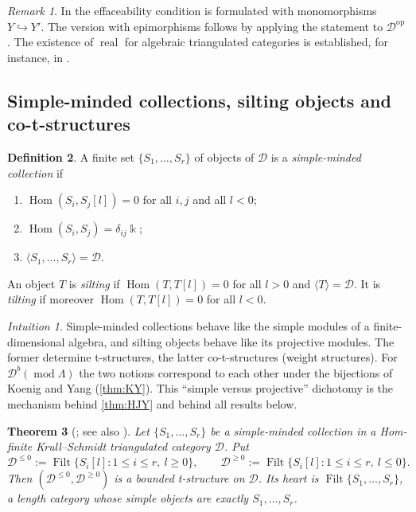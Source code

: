\documentclass[11pt,reqno]{amsart}
\theoremstyle{plain}
\newtheorem{theorem}{Theorem}[section]
\theoremstyle{definition}
\newtheorem{definition}[theorem]{Definition}
\theoremstyle{remark}
\newtheorem{remark}[theorem]{Remark}
\newtheorem*{intuition}{Intuition}
\newcommand{\kk}{\Bbbk}
\DeclareMathOperator{\Hom}{Hom}
\DeclareMathOperator{\Filt}{Filt}
\DeclareMathOperator{\real}{real}
\newcommand{\modd}{\operatorname{mod}}
\newcommand{\Db}{\mathcal{D}^b}
\newcommand{\thick}[1]{\langle #1\rangle}
\newcommand{\cD}{\mathcal{D}}
\begin{document}
\begin{remark}
In \cite[Prop.~3.1.16]{BBD82} the effaceability condition is formulated with monomorphisms $Y\hookrightarrow Y'$. The version with epimorphisms follows by applying the statement to $\cD^{\mathrm{op}}$. The existence of $\real$ for algebraic triangulated categories is established, for instance, in \cite{Let24}.
\end{remark}

\subsection{Simple-minded collections, silting objects and co-t-structures}

\begin{definition}\label{def:smc}
A finite set $\{S_1,\dots,S_r\}$ of objects of $\cD$ is a \emph{simple-minded collection} if
\begin{enumerate}
\item[(SM1)] $\Hom(S_i,S_j[l])=0$ for all $i,j$ and all $l<0$;
\item[(SM2)] $\Hom(S_i,S_j)=\delta_{ij}\kk$;
\item[(SM3)] $\thick{S_1,\dots,S_r}=\cD$.
\end{enumerate}
An object $T$ is \emph{silting} if $\Hom(T,T[l])=0$ for all $l>0$ and $\thick{T}=\cD$. It is \emph{tilting} if moreover $\Hom(T,T[l])=0$ for all $l<0$.
\end{definition}

\begin{intuition}
Simple-minded collections behave like the simple modules of a finite-dimensional algebra, and silting objects behave like its projective modules. The former determine t-structures, the latter co-t-structures (weight structures). For $\Db(\modd\Lambda)$ the two notions correspond to each other under the bijections of Koenig and Yang (\cref{thm:KY}). This ``simple versus projective'' dichotomy is the mechanism behind \cref{thm:HJY} and behind all results below.
\end{intuition}

\begin{theorem}[{\cite{AN09}; see also \cite[\S5]{KY14}}]\label{thm:smc}
Let $\{S_1,\dots,S_r\}$ be a simple-minded collection in a Hom-finite Krull--Schmidt triangulated category $\cD$. Put
\[\cD^{\le0}:=\Filt\{S_i[l]: 1\le i\le r,\ l\ge0\},\qquad \cD^{\ge0}:=\Filt\{S_i[l]:1\le i\le r,\ l\le0\}.\]
Then $(\cD^{\le0},\cD^{\ge0})$ is a bounded t-structure on $\cD$. Its heart is $\Filt\{S_1,\dots,S_r\}$, a length category whose simple objects are exactly $S_1,\dots,S_r$.
\end{theorem}
\end{document}
